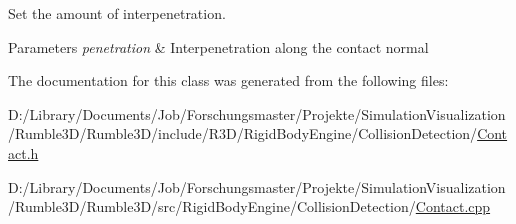 Set the amount of interpenetration. 


\begin{DoxyParams}{Parameters}
{\em penetration} & Interpenetration along the contact normal \\
\hline
\end{DoxyParams}


The documentation for this class was generated from the following files\+:\begin{DoxyCompactItemize}
\item 
D\+:/\+Library/\+Documents/\+Job/\+Forschungsmaster/\+Projekte/\+Simulation\+Visualization/\+Rumble3\+D/\+Rumble3\+D/include/\+R3\+D/\+Rigid\+Body\+Engine/\+Collision\+Detection/\mbox{\hyperlink{_contact_8h}{Contact.\+h}}\item 
D\+:/\+Library/\+Documents/\+Job/\+Forschungsmaster/\+Projekte/\+Simulation\+Visualization/\+Rumble3\+D/\+Rumble3\+D/src/\+Rigid\+Body\+Engine/\+Collision\+Detection/\mbox{\hyperlink{_contact_8cpp}{Contact.\+cpp}}\end{DoxyCompactItemize}
